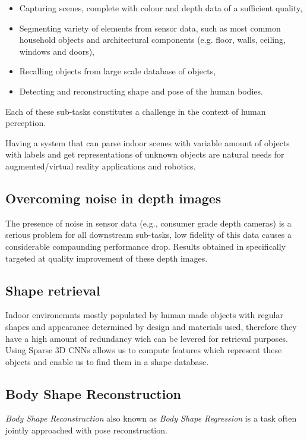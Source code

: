 \begin{itemize}
    \item Capturing scenes, complete with colour and depth data of a sufficient quality,
    \item Segmenting variety of elements from sensor data, such as most common household objects and architectural components (e.g. floor, walls, ceiling, windows and doors),
    \item Recalling objects from large scale database of objects,
    \item Detecting and reconstructing shape and pose of the human bodies.
\end{itemize}

Each of these sub-tasks constitutes a challenge in the context of human perception.

Having a system that can parse indoor scenes with variable amount of objects with labels and get representations of unknown objects are natural needs for augmented/virtual reality applications and robotics.

\subsection{Overcoming noise in depth images}
The presence of noise in sensor data (e.g., consumer grade depth cameras) is a serious problem for all downstream sub-tasks, low fidelity of this data causes a considerable compaunding performance drop. Results obtained in  specifically targeted at quality improvement of these depth images.

\subsection{Shape retrieval}

Indoor environemnts mostly populated by human made objects with regular shapes and appearance determined by design and materials used, therefore they have a high amount of redundancy wich can be levered for retrieval purposes. Using Sparse 3D CNNs allows us to compute features which represent these objects and enable us to find them in a shape database. 

\subsection{Body Shape Reconstruction}

\textit{Body Shape Reconstruction} also known as \textit{Body Shape Regression} is a task often jointly approached with pose reconstruction.



